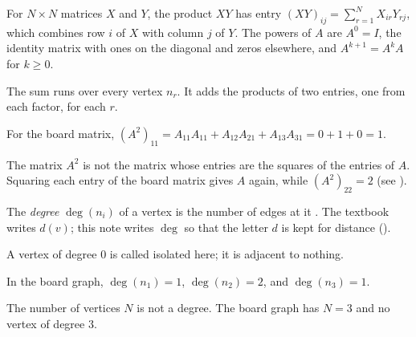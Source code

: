 \begin{definition}\label{def:power}
For $N\times N$ matrices $X$ and $Y$, the product $XY$ has entry $(XY)_{ij}=\sum_{r=1}^{N}X_{ir}Y_{rj}$, which combines row $i$ of $X$ with column $j$ of $Y$. The powers of $A$ are $A^0=I$, the identity matrix with ones on the diagonal and zeros elsewhere, and $A^{k+1}=A^kA$ for $k\ge 0$.
\end{definition}
\begin{remark}
The sum runs over every vertex $n_r$. It adds the products of two entries, one from each factor, for each $r$.
\end{remark}
\begin{example}
For the board matrix, $(A^2)_{11}=A_{11}A_{11}+A_{12}A_{21}+A_{13}A_{31}=0+1+0=1$.
\end{example}
\begin{nonexample}
The matrix $A^2$ is not the matrix whose entries are the squares of the entries of $A$. Squaring each entry of the board matrix gives $A$ again, while $(A^2)_{22}=2$ (see ).
\end{nonexample}

\begin{definition}\label{def:degree}
The \emph{degree} $\deg(n_i)$ of a vertex is the number of edges at it \cite[Def.~1.2.1, p.~16]{petrosyan2015grafneri}. The textbook writes $d(v)$; this note writes $\deg$ so that the letter $d$ is kept for distance ().
\end{definition}
\begin{remark}
A vertex of degree $0$ is called isolated here; it is adjacent to nothing.
\end{remark}
\begin{example}
In the board graph, $\deg(n_1)=1$, $\deg(n_2)=2$, and $\deg(n_3)=1$.
\end{example}
\begin{nonexample}
The number of vertices $N$ is not a degree. The board graph has $N=3$ and no vertex of degree $3$.
\end{nonexample}

